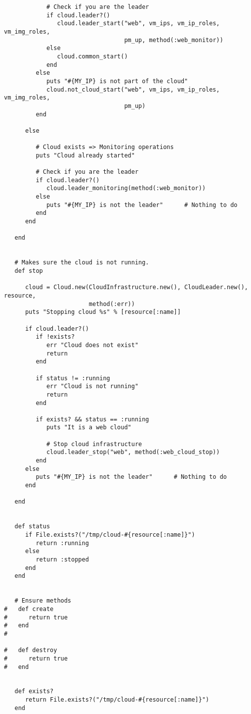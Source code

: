 \begin{lstlisting}
            # Check if you are the leader
            if cloud.leader?()
               cloud.leader_start("web", vm_ips, vm_ip_roles, vm_img_roles,
                                  pm_up, method(:web_monitor))
            else
               cloud.common_start()
            end
         else
            puts "#{MY_IP} is not part of the cloud"
            cloud.not_cloud_start("web", vm_ips, vm_ip_roles, vm_img_roles,
                                  pm_up)
         end
         
      else
         
         # Cloud exists => Monitoring operations
         puts "Cloud already started"
         
         # Check if you are the leader
         if cloud.leader?()
            cloud.leader_monitoring(method(:web_monitor))
         else
            puts "#{MY_IP} is not the leader"      # Nothing to do
         end
      end
      
   end


   # Makes sure the cloud is not running.
   def stop

      cloud = Cloud.new(CloudInfrastructure.new(), CloudLeader.new(), resource,
                        method(:err))
      puts "Stopping cloud %s" % [resource[:name]]
      
      if cloud.leader?()
         if !exists?
            err "Cloud does not exist"
            return
         end
         
         if status != :running
            err "Cloud is not running"
            return
         end
         
         if exists? && status == :running
            puts "It is a web cloud"
         
            # Stop cloud infrastructure
            cloud.leader_stop("web", method(:web_cloud_stop))
         end
      else
         puts "#{MY_IP} is not the leader"      # Nothing to do
      end
   
   end


   def status
      if File.exists?("/tmp/cloud-#{resource[:name]}")
         return :running
      else
         return :stopped
      end
   end


   # Ensure methods
#   def create
#      return true
#   end
#   

#   def destroy
#      return true
#   end


   def exists?
      return File.exists?("/tmp/cloud-#{resource[:name]}")
   end
   

\end{lstlisting}
